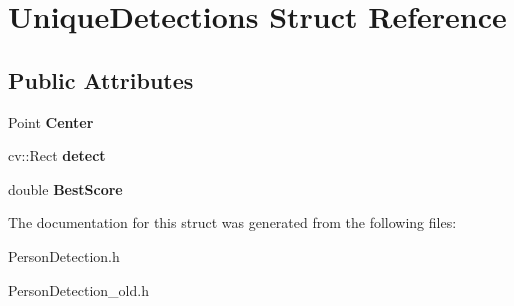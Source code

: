 \hypertarget{struct_unique_detections}{\section{Unique\-Detections Struct Reference}
\label{struct_unique_detections}
}
\subsection*{Public Attributes}
\begin{DoxyCompactItemize}
\item 
\hypertarget{struct_unique_detections_ac04402d436abbee621deaf288a37aafb}{Point {\bfseries Center}}\label{struct_unique_detections_ac04402d436abbee621deaf288a37aafb}

\item 
\hypertarget{struct_unique_detections_a4d357431d7d4605368ac6159b6b91ab4}{cv\-::\-Rect {\bfseries detect}}\label{struct_unique_detections_a4d357431d7d4605368ac6159b6b91ab4}

\item 
\hypertarget{struct_unique_detections_aa39618ff58f2f18dab9f8f0c36bffcae}{double {\bfseries Best\-Score}}\label{struct_unique_detections_aa39618ff58f2f18dab9f8f0c36bffcae}

\end{DoxyCompactItemize}


The documentation for this struct was generated from the following files\-:\begin{DoxyCompactItemize}
\item 
Person\-Detection.\-h\item 
Person\-Detection\-\_\-old.\-h\end{DoxyCompactItemize}
